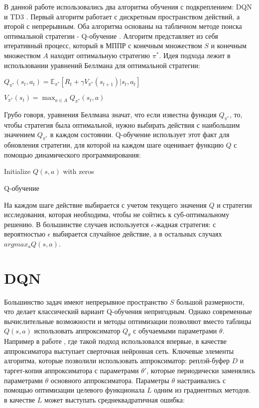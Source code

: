 \documentclass{mipt-thesis-bs}
\begin{document}
В данной работе использовались два алгоритма обучения с подкреплением: DQN \cite{DQN} и TD3 \cite{TD3}. Первый алгоритм работает с дискретным пространством действий, а второй с непрерывным. Оба алгоритма основаны на табличном методе поиска оптимальной стратегии - Q-обучение \cite{Q-обучение}. Алгоритм представляет из себя итеративный процесс, который в МППР с конечным множеством $S$ и конечным множеством $A$ находит оптимальную стратегию $\pi^*$. Идея подхода лежит в использовании уравнений Беллмана для оптимальной стратегии:
\begin{center}
$Q_{\pi^*}(s_t, a_t) = \mathbb{E}_{\pi^*}[R_{t} + \gamma V_{\pi^*}(s_{t+1})| s_t, a_t]$

$V_{\pi^*}(s_t) = \max_{a\in A}Q_{\pi^*}(s_t, a)$
\end{center}

Грубо говоря, уравнения Беллмана значат, что если известна функция $Q_{\pi^*}$, то, чтобы стратегия была оптимальной, нужно выбирать действия с наибольшим значением $Q_{\pi^*}$ в каждом состоянии. Q-обучение использует этот факт для обновления стратегии, для которой на каждом шаге оценивает функцию $Q$ с помощью динамического программирования: 

\begin{algorithm}[H]
\SetAlgoLined
Initialize $Q(s, a)$ with zeros\;
 \caption{Q-обучение}
\end{algorithm}

На каждом шаге действие выбирается с учетом текущего значения $Q$ и стратегии исследования, которая необходима, чтобы не сойтись к суб-оптимальному решению. В большинстве случаев используется $\epsilon$-жадная стратегия: с вероятностью $\epsilon$ выбирается случайное действие, а в остальных случаях $argmax_aQ(s,a)$. 

\chapter{DQN}

Большинство задач имеют непрерывное пространство $S$ большой размерности, что делает классический вариант Q-обучения непригодным. Однако современные вычислительные возможности и методы оптимизации позволяют вместо таблицы $Q(s,a)$ использовать аппроксиматор $Q_\theta$ с обучаемыми параметрами $\theta$. Например в работе \cite{DQN}, где такой подход использовался впервые, в качестве аппроксиматора выступает сверточная нейронная сеть. Ключевые элементы алгоритма, которые позволили использовать аппроксиматор: реплэй-буфер $D$ и таргет-копия аппроксиматора с параметрами $\theta'$, которые периодически заменялись параметрами $\theta$ основного аппроксиматора. Параметры $\theta$ настраивались с помощью оптимизации  целевого функционала $L$ одним из градиентных методов. в качестве $L$ может выступать среднеквадратичная ошибка:
\end{document}
